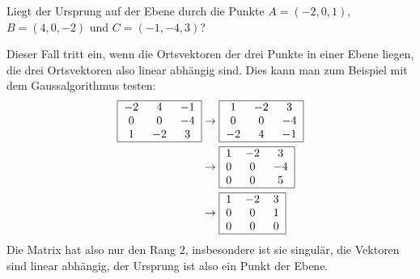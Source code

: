 Liegt der Ursprung  auf der Ebene durch die Punkte
$A=(-2, 0, 1)$, $B=(4,0,-2)$ und $C=(-1,-4,3)$?


\begin{loesung}
Dieser Fall tritt ein, wenn die Ortsvektoren der drei Punkte
in einer Ebene liegen, die drei Ortsvektoren also linear abhängig
sind. Dies kann man zum Beispiel mit dem Gaussalgorithmus testen:
\begin{align*}
\begin{tabular}{|ccc|}
\hline
$-2$&4&$-1$\\
0&0&$-4$\\
1&$-2$&3\\
\hline
\end{tabular}
&\rightarrow
\begin{tabular}{|ccc|}
\hline
1&$-2$&3\\
0&0&$-4$\\
$-2$&4&$-1$\\
\hline
\end{tabular}
\\
&\rightarrow
\begin{tabular}{|ccc|}
\hline
1&$-2$&3\\
0&0&$-4$\\
0&0&5\\
\hline
\end{tabular}
\\
&\rightarrow
\begin{tabular}{|ccc|}
\hline
1&$-2$&3\\
0&0&1\\
0&0&0\\
\hline
\end{tabular}
\end{align*}
Die Matrix hat also nur den Rang $2$, insbesondere ist sie singulär,
die Vektoren sind linear abhängig, der Ursprung ist also ein Punkt
der Ebene.


\end{loesung}
